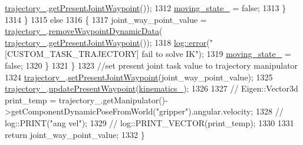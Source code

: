 \begin{DoxyCode}
      \hyperlink{classrobotis__manipulator_1_1_robotis_manipulator_a992d2c7221bcaab8e9a688d12728d738}{trajectory\_}.\hyperlink{classrobotis__manipulator_1_1_trajectory_a840fce5e4b16eb4ef957ff0aba2bf146}{getPresentJointWaypoint}());
1312         \hyperlink{classrobotis__manipulator_1_1_robotis_manipulator_a5b7990548dd779b1ca66a2ad83a74f76}{moving\_state\_} = \textcolor{keyword}{false};
1313       \}
1314     \}
1315     \textcolor{keywordflow}{else}
1316     \{
1317       joint\_way\_point\_value = \hyperlink{classrobotis__manipulator_1_1_robotis_manipulator_a992d2c7221bcaab8e9a688d12728d738}{trajectory\_}.\hyperlink{classrobotis__manipulator_1_1_trajectory_a3e05d461f6bdf874a58a6a35ff6ce351}{removeWaypointDynamicData}(
      \hyperlink{classrobotis__manipulator_1_1_robotis_manipulator_a992d2c7221bcaab8e9a688d12728d738}{trajectory\_}.\hyperlink{classrobotis__manipulator_1_1_trajectory_a840fce5e4b16eb4ef957ff0aba2bf146}{getPresentJointWaypoint}());
1318       \hyperlink{namespacerobotis__manipulator_1_1log_a6a84cb5481107ad244344093086fb557}{log::error}(\textcolor{stringliteral}{"[CUSTOM\_TASK\_TRAJECTORY] fail to solve IK"});
1319       \hyperlink{classrobotis__manipulator_1_1_robotis_manipulator_a5b7990548dd779b1ca66a2ad83a74f76}{moving\_state\_} = \textcolor{keyword}{false};
1320     \}
1321   \}
1323   \textcolor{comment}{//set present joint task value to trajectory manipulator}
1324   \hyperlink{classrobotis__manipulator_1_1_robotis_manipulator_a992d2c7221bcaab8e9a688d12728d738}{trajectory\_}.\hyperlink{classrobotis__manipulator_1_1_trajectory_a58b1d4fb60f7e3ed9150d312766debc1}{setPresentJointWaypoint}(joint\_way\_point\_value);
1325   \hyperlink{classrobotis__manipulator_1_1_robotis_manipulator_a992d2c7221bcaab8e9a688d12728d738}{trajectory\_}.\hyperlink{classrobotis__manipulator_1_1_trajectory_a05e95f1473723592130f63321664fb0c}{updatePresentWaypoint}(\hyperlink{classrobotis__manipulator_1_1_robotis_manipulator_a9a37fd068504dfe5fab346884790fc8f}{kinematics\_});
1326 
1327 \textcolor{comment}{//  Eigen::Vector3d print\_temp =
       trajectory\_.getManipulator()->getComponentDynamicPoseFromWorld("gripper").angular.velocity;}
1328 \textcolor{comment}{//  log::PRINT("ang vel");}
1329 \textcolor{comment}{//  log::PRINT\_VECTOR(print\_temp);}
1330 
1331   \textcolor{keywordflow}{return} joint\_way\_point\_value;
1332 \}
\end{DoxyCode}


